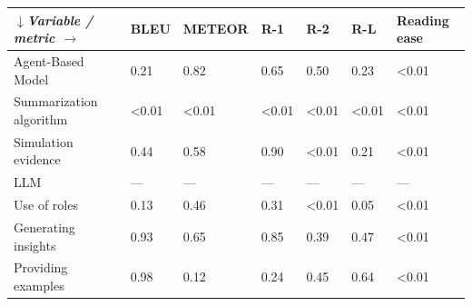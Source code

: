 \begin{tabular}{|l|l|l|l|l|l|l|}
\hline
\textit{$\downarrow$Variable / metric $\rightarrow$} & BLEU & METEOR & R-1 & R-2 & R-L & Reading ease \\
 \hline
 Agent-Based Model & 0.21 & 0.82 & 0.65 & 0.50 & 0.23 & \textless{}0.01 \\
 \hline
 Summarization algorithm & \textless{}0.01 & \textless{}0.01 & \textless{}0.01 & \textless{}0.01 & \textless{}0.01 & \textless{}0.01 \\
 \hline
 Simulation evidence & 0.44 & 0.58 & 0.90 & \textless{}0.01 & 0.21 & \textless{}0.01 \\
 \hline
 LLM & — & — & — & — & — & — \\
 \hline
 Use of roles & 0.13 & 0.46 & 0.31 & \textless{}0.01 & 0.05 & \textless{}0.01 \\
 \hline
 Generating insights & 0.93 & 0.65 & 0.85 & 0.39 & 0.47 & \textless{}0.01 \\
 \hline
 Providing examples & 0.98 & 0.12 & 0.24 & 0.45 & 0.64 & \textless{}0.01 \\
\hline
\end{tabular}
